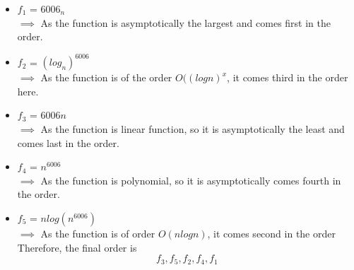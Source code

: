 \documentclass[12pt, twoside]{article}
\begin{document}


\begin{problems}

\problem  %

\begin{problemparts}
\problempart %
\begin{itemize}
    \item $f_1$ = $6006_n$ \\
    $\implies$ As the function is asymptotically the largest and comes first in the order.
    \newline 
    \item $f_2$ = $(log_n)^{6006}$ \\
    $\implies$  As the function is of the order $O((log n)^x$, it comes third in the order here.
    \item $f_3$ = $6006n$ \\
    $\implies$ As the function is linear function, so it is asymptotically the least and comes last in the order.
    \newline 
    \item $f_4$ = $n^{6006}$ \\
    $\implies$ As the function is polynomial, so it is asymptotically comes fourth in the order.
    \newline 
    \item $f_5$ = $nlog(n^{6006})$ \\
    $\implies$ As the function is of order $O(n log n)$, it comes second in the order
    \newline 
    Therefore, the final order is \\
    \[f_{3} , f_{5} , f_{2} , f_{4} , f_{1}\]
\end{itemize}


\end{problemparts}
\end{problems}
\end{document}

